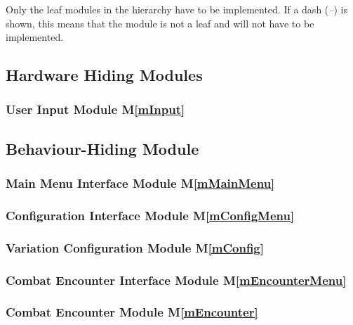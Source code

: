 \documentclass[12pt, titlepage]{article}
\begin{document}
Only the leaf modules in the hierarchy have to be implemented. If a dash
(\emph{--}) is shown, this means that the module is not a leaf and will not have
to be implemented.

\subsection{Hardware Hiding Modules}

\subsubsection{User Input Module M\ref{mInput}}




\subsection{Behaviour-Hiding Module}

\subsubsection{Main Menu Interface Module M\ref{mMainMenu}}


\subsubsection{Configuration Interface Module M\ref{mConfigMenu}}


\subsubsection{Variation Configuration Module M\ref{mConfig}}







\subsubsection{Combat Encounter Interface Module M\ref{mEncounterMenu}}


\subsubsection{Combat Encounter Module M\ref{mEncounter}}

\end{document}
